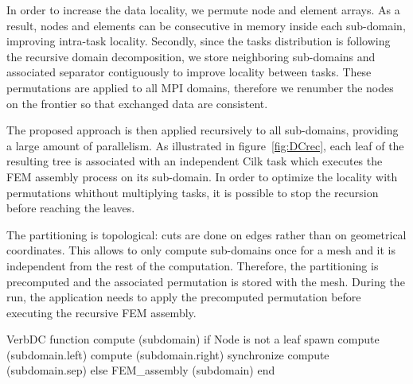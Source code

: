 \documentclass[10pt]{IOS-Book-Article}
\begin{document}
In order to increase the data locality, we permute node and element arrays.
As a result, nodes and elements can be consecutive in memory inside each sub-domain, improving intra-task locality.
Secondly, since the tasks distribution is following the recursive domain decomposition, we store neighboring sub-domains and associated separator contiguously to improve locality between tasks.
These permutations are applied to all MPI domains, therefore we renumber the nodes on the frontier so that exchanged data are consistent.


%

The proposed approach is then applied recursively to all sub-domains, providing a large amount of parallelism.
As illustrated in figure~\ref{fig:DCrec}, each leaf of the resulting tree is associated with an independent Cilk task which executes the FEM assembly process on its sub-domain.
In order to optimize the locality with permutations whithout multiplying tasks, it is possible to stop the recursion before reaching the leaves.

The partitioning is topological: cuts are done on edges rather than on geometrical coordinates.
This allows to only compute sub-domains once for a mesh and it is independent from the rest of the computation.
Therefore, the partitioning is precomputed and the associated permutation is stored with the mesh.
During the run, the application needs to apply the precomputed permutation before executing the recursive FEM assembly.

\begin{SaveVerbatim}[]{VerbDC}
function compute (subdomain) 
  if Node is not a leaf
    spawn compute (subdomain.left)
    compute (subdomain.right)
    synchronize
    compute (subdomain.sep)
  else
    FEM_assembly (subdomain)
end    
\end{SaveVerbatim}
\end{document}
